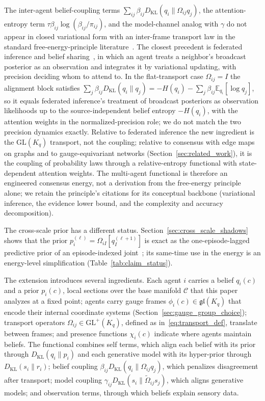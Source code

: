 The inter-agent belief-coupling terms $\sum_{ij}\beta_{ij}D_{\mathrm{KL}}(q_i\|\Omega_{ij}q_j)$, the attention-entropy term $\tau\beta_{ij}\log(\beta_{ij}/\pi_{ij})$, and the model-channel analog with $\gamma$ do not appear in closed variational form with an inter-frame transport law in the standard free-energy-principle literature~\cite{Friston2010, parr2022active}. The closest precedent is federated inference and belief sharing~\cite{friston2024federated}, in which an agent treats a neighbor's broadcast posterior as an observation and integrates it by variational updating, with precision deciding whom to attend to. In the flat-transport case $\Omega_{ij} = I$ the alignment block satisfies $\sum_j \beta_{ij}D_{\mathrm{KL}}(q_i\|q_j) = -H(q_i) - \sum_j \beta_{ij}\mathbb{E}_{q_i}[\log q_j]$, so it equals federated inference's treatment of broadcast posteriors as observation likelihoods up to the source-independent belief entropy $-H(q_i)$, with the attention weights in the normalized-precision role; we do not match the two precision dynamics exactly. Relative to federated inference the new ingredient is the $\mathrm{GL}(K_q)$ transport, not the coupling; relative to consensus with edge maps on graphs and to gauge-equivariant networks (Section~\ref{sec:related_work}), it is the coupling of probability laws through a relative-entropy functional with state-dependent attention weights. The multi-agent functional is therefore an engineered consensus energy, not a derivation from the free-energy principle alone; we retain the principle's citations for its conceptual backbone (variational inference, the evidence lower bound, and the complexity and accuracy decomposition).

The cross-scale prior has a different status. Section~\ref{sec:cross_scale_shadows} shows that the prior $p_i^{(\ell)}=\Omega_{iI}[q_I^{(\ell+1)}]$ is exact as the one-episode-lagged predictive prior of an episode-indexed joint~\cite[Ch.~12]{DennisGaugeVFE2026}; its same-time use in the energy is an energy-level simplification (Table~\ref{tab:claim_status}).

The extension introduces several ingredients. Each agent $i$ carries a belief $q_i(c)$ and a prior $p_i(c)$, local sections over the base manifold $\mathcal{C}$ that this paper analyzes at a fixed point; agents carry gauge frames $\phi_i(c) \in \mathfrak{gl}(K_q)$ that encode their internal coordinate systems (Section~\ref{sec:gauge_group_choice}); transport operators $\Omega_{ij} \in \mathrm{GL}^+(K_q)$, defined as in~\eqref{eq:transport_def}, translate between frames; and presence functions $\chi_i(c)$ indicate where agents maintain beliefs. The functional combines self terms, which align each belief with its prior through $D_{\mathrm{KL}}(q_i \| p_i)$ and each generative model with its hyper-prior through $D_{\mathrm{KL}}(s_i \| r_i)$; belief coupling $\beta_{ij}D_{\mathrm{KL}}(q_i\|\Omega_{ij}q_j)$, which penalizes disagreement after transport; model coupling $\gamma_{ij}D_{\mathrm{KL}}(s_i\|\tilde{\Omega}_{ij}s_j)$, which aligns generative models; and observation terms, through which beliefs explain sensory data.

